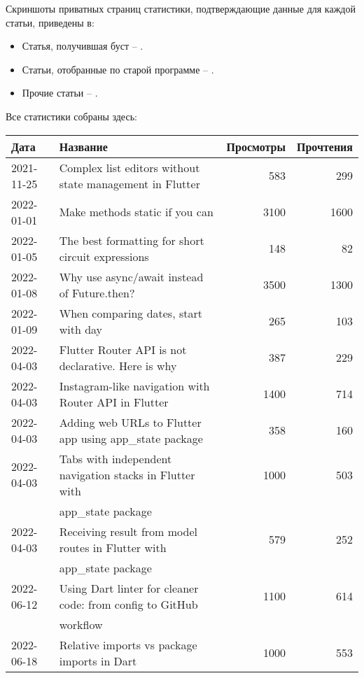 
Скриншоты приватных страниц статистики, подтверждающие данные для каждой статьи, приведены в:

\begin{itemize}
    \item Статья, получившая буст -- .
    \item Статьи, отобранные по старой программе -- .
    \item Прочие статьи -- .
\end{itemize}

Все статистики собраны здесь:

\begin{longtable}{|l|l|r|r|}
    \hline
    \textbf{Дата} & \textbf{Название} & \textbf{Просмотры} & \textbf{Прочтения}\\
    \hline
    2021-11-25 & Complex list editors without state management in Flutter & 583 & 299\\
    2022-01-01 & Make methods static if you can & 3100 & 1600\\
    2022-01-05 & The best formatting for short circuit expressions & 148 & 82\\
    2022-01-08 & Why use async/await instead of Future.then? & 3500 & 1300\\
    2022-01-09 & When comparing dates, start with day & 265 & 103\\
    2022-04-03 & Flutter Router API is not declarative. Here is why & 387 & 229\\
    2022-04-03 & Instagram-like navigation with Router API in Flutter & 1400 & 714\\
    2022-04-03 & Adding web URLs to Flutter app using app\_state package & 358 & 160\\
    2022-04-03 & Tabs with independent navigation stacks in Flutter with & 1000 & 503\\
    & app\_state package & & \\
    2022-04-03 & Receiving result from model routes in Flutter with & 579 & 252\\
    & app\_state package & & \\
    2022-06-12 & Using Dart linter for cleaner code: from config to GitHub & 1100 & 614\\
    & workflow & & \\
    2022-06-18 & Relative imports vs package imports in Dart & 1000 & 553\\

\end{longtable}
